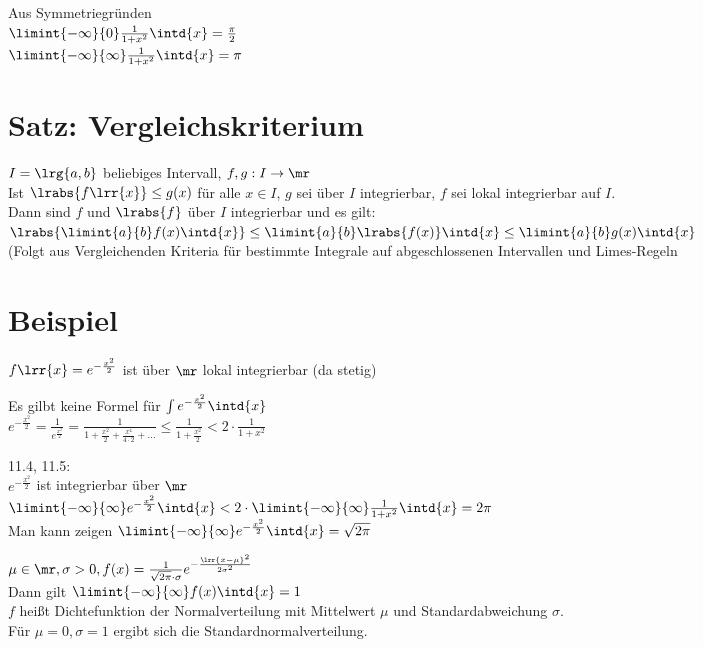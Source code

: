 	Aus Symmetriegründen\\
	$\limint{-\infty}{0}\frac{1}{1+x^2}\intd{x}=\frac{\pi}{2}$\\
	$\limint{-\infty}{\infty}\frac{1}{1+x^2}\intd{x}=\pi$
	
\section{Satz: Vergleichskriterium}
	$I=\lrg{a,b}$ beliebiges Intervall, $f,g: I\rightarrow\mr$\\
	Ist $\lrabs{f\lrr{x}}\leq g(x)$ für alle $x\in I$, $g$ sei über $I$ integrierbar, $f$ sei lokal integrierbar auf $I$.\\
	Dann sind $f$ und $\lrabs{f}$ über $I$ integrierbar und es gilt:\\
	$\lrabs{\limint{a}{b}f(x)\intd{x}}\leq\limint{a}{b}\lrabs{f(x)}\intd{x}\leq\limint{a}{b}g(x)\intd{x}$\\
	(Folgt aus Vergleichenden Kriteria für bestimmte Integrale auf abgeschlossenen Intervallen und Limes-Regeln
	
\section{Beispiel}
		\item $f\lrr{x}=e^{-\frac{x^2}{2}}$ ist über $\mr$ lokal integrierbar (da stetig)\\
			
			Es gilbt keine Formel für $\int e^{-\frac{x^2}{2}}\intd{x}$\\
			$e^{-\frac{x^2}{2}}=\frac{1}{e^{\frac{x^2}{2}}}=\frac{1}{1+\frac{x^2}{2}+\frac{x^4}{4\cdot 2}+\dots}\leq\frac{1}{1+\frac{x^2}{2}}< 2\cdot\frac{1}{1+x^2}$
			
			11.4, 11.5:\\
			$e^{-\frac{x^2}{2}}$ ist integrierbar über $\mr$\\
			$\limint{-\infty}{\infty}e^{-\frac{x^2}{2}}\intd{x}<2\cdot\limint{-\infty}{\infty}\frac{1}{1+x^2}\intd{x}=2\pi$\\
			Man kann zeigen $\limint{-\infty}{\infty}e^{-\frac{x^2}{2}}\intd{x}=\sqrt{2\pi}$
		\item $\mu\in\mr, \sigma>0, f(x)=\frac{1}{\sqrt{2\pi}\cdot\sigma}e^{-\frac{\lrr{x-\mu}^2}{2\sigma^2}}$\\
			Dann gilt $\limint{-\infty}{\infty}f(x)\intd{x}=1$\\
			$f$ heißt Dichtefunktion der Normalverteilung mit Mittelwert $\mu$ und Standardabweichung $\sigma$.\\
			Für $\mu=0, \sigma=1$ ergibt sich die Standardnormalverteilung.
	\subExEnd
